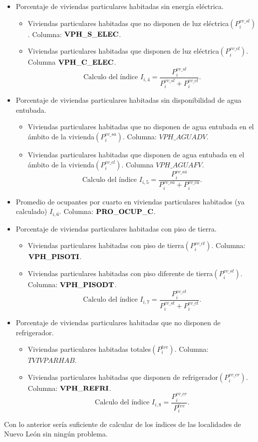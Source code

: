 \documentclass[paper=letter, fontsize=11pt]{scrartcl}
\numberwithin{equation}{section} %
\numberwithin{figure}{section} %
\numberwithin{table}{section} %
\begin{document}
\begin{itemize}
\begin{itemize}
    \end{itemize}
    \item Porcentaje de viviendas particulares habitadas sin energía eléctrica.
    \begin{itemize}
        \item  Viviendas particulares habitadas que no disponen de luz eléctrica$\left(P_i^{vv\_sl}\right)$. Columna: $\bf VPH\_S\_ELEC$.
        \item Viviendas particulares habitadas que disponen de luz eléctrica$\left(P_i^{vv\_cl}\right)$. Columna $\bf VPH\_C\_ELEC$.
        $$\text{Calculo del índice } I_{i,4}=\frac{P_i^{vv\_sl}}{P_i^{vv\_sl}+P_i^{vv\_cl}}.$$
    \end{itemize}
    \item Porcentaje de viviendas particulares habitadas sin disponibilidad de agua entubada.
    \begin{itemize}
        \item Viviendas particulares habitadas que no disponen de agua entubada en el ámbito de la vivienda$\left(P_i^{vv\_sa}\right)$. Columna: $VPH\_AGUADV$.
        \item Viviendas particulares habitadas que disponen de agua entubada en el ámbito de la vivienda$\left(P_i^{vv\_cl}\right)$. Columna $VPH\_AGUAFV$.
        $$\text{Calculo del índice } I_{i,5}=\frac{P_i^{vv\_sa}}{P_i^{vv\_sa}+P_i^{vv\_ca}}.$$
    \end{itemize}
    
    \item Promedio de ocupantes por cuarto en viviendas particulares habitados (ya calculado) $I_{i,6}$. Columna: $\bf PRO\_OCUP\_C$.
    
    \item Porcentaje de viviendas particulares habitadas con piso de tierra.
    \begin{itemize}
        \item Viviendas particulares habitadas con piso de tierra$\left(P_i^{vv\_ct}\right)$. Columna: $\bf VPH\_PISOTI$.
        \item Viviendas particulares habitadas con piso diferente de tierra$\left(P_i^{vv\_st}\right)$. Columna: $\bf VPH\_PISODT$.
        $$\text{Calculo del índice } I_{i,7}=\frac{P_i^{vv\_ct}}{P_i^{vv\_st}+P_i^{vv\_ct}}.$$
    \end{itemize}
    \item Porcentaje de viviendas particulares habitadas que no disponen de refrigerador.
    \begin{itemize}
        \item Viviendas particulares habitadas totales$\left(P_i^{tvv}\right)$. Columna: $TVIVPARHAB$.
        \item Viviendas particulares habitadas que disponen de refrigerador$\left(P_i^{vv\_cr}\right)$. Columna: $\bf VPH\_REFRI$.
        $$\text{Calculo del índice } I_{i,8}=\frac{P_i^{vv\_cr}}{P_i^{tvv}}.$$
    \end{itemize}
\end{itemize} 
Con lo anterior sería suficiente de calcular de los índices de las localidades de Nuevo León sin ningún problema. 
\printbibliography
\end{document}

